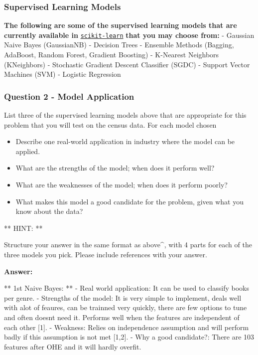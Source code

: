 \documentclass[11pt]{article}
\providecommand{\tightlist}{%
      \setlength{\itemsep}{0pt}\setlength{\parskip}{0pt}}
\begin{document}
    \subsubsection{Supervised Learning
Models}\label{supervised-learning-models}

\textbf{The following are some of the supervised learning models that
are currently available in}
\href{http://scikit-learn.org/stable/supervised_learning.html}{\texttt{scikit-learn}}
\textbf{that you may choose from:} - Gaussian Naive Bayes (GaussianNB) -
Decision Trees - Ensemble Methods (Bagging, AdaBoost, Random Forest,
Gradient Boosting) - K-Nearest Neighbors (KNeighbors) - Stochastic
Gradient Descent Classifier (SGDC) - Support Vector Machines (SVM) -
Logistic Regression

    \subsubsection{Question 2 - Model
Application}\label{question-2---model-application}

List three of the supervised learning models above that are appropriate
for this problem that you will test on the census data. For each model
chosen

\begin{itemize}
\tightlist
\item
  Describe one real-world application in industry where the model can be
  applied.
\item
  What are the strengths of the model; when does it perform well?
\item
  What are the weaknesses of the model; when does it perform poorly?
\item
  What makes this model a good candidate for the problem, given what you
  know about the data?
\end{itemize}

** HINT: **

Structure your answer in the same format as above\^{}, with 4 parts for
each of the three models you pick. Please include references with your
answer.

    \textbf{Answer: }

** 1st Naive Bayes: ** - Real world application: It can be used to
classify books per genre. - Strengths of the model: It is very simple to
implement, deals well with alot of feaures, can be trainned very
quickly, there are few options to tune and often doesnt need it.
Performs well when the features are independent of each other {[}1{]}. -
Weakness: Relies on independence assumption and will perform badly if
this assumption is not met {[}1,2{]}. - Why a good candidate?: There are
103 features after OHE and it will hardly overfit.
\end{document}
